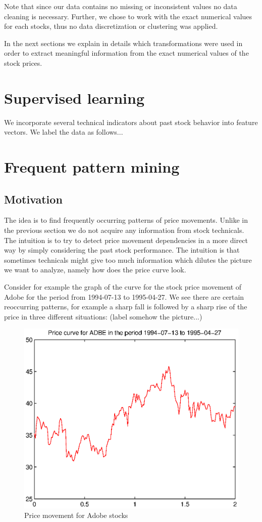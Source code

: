 \documentclass{llncs}
\begin{document}
Note that since our data contains no missing or inconsistent values no data cleaning is necessary. Further, we chose to work with the exact numerical values for each stocks, thus no data discretization or clustering was applied.

In the next sections we explain in details which transformations were used in order to extract meaningful information from the exact numerical values of the stock prices.
\section*{Supervised learning}
We incorporate several technical indicators about past stock behavior into feature vectors. We label the data as follows...
 
\section*{Frequent pattern mining}
\subsection*{Motivation}
The idea is to find frequently occurring patterns of price movements. Unlike in the previous section we do not acquire any information from stock technicals. The intuition is to try to detect price movement dependencies in a more direct way by simply considering the past stock performance. The intuition is that sometimes technicals might give too much information which dilutes the picture we want to analyze, namely how does the price curve look.

Consider for example the graph of the curve for the stock price movement of Adobe for the period from 1994-07-13 to 1995-04-27. We see there are certain reoccurring patterns, for example a sharp fall is followed by a sharp rise of the price in three different situations: (label somehow the picture...) 

\begin{figure}[htb!]
\caption{Price movement for Adobe stocks}
\centering%
\includegraphics[scale=0.7]{ADBE.eps}
\end{figure}
\end{document}
